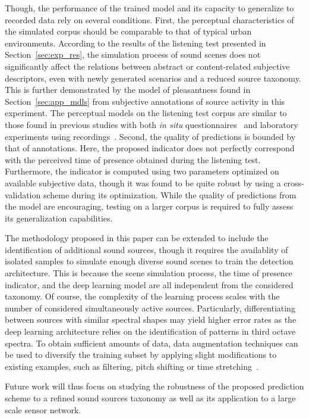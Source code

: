 \documentclass[twocolumn]{article}
\begin{document}
Though, the performance of the trained model and its capacity to generalize to recorded data rely on several conditions. First, the perceptual characteristics of the simulated corpus should be comparable to that of typical urban environments. According to the results of the listening test presented in Section~\ref{sec:exp_res}, the simulation process of sound scenes does not significantly affect the relations between abstract or content-related subjective descriptors, even with newly generated scenarios and a reduced source taxonomy. This is further demonstrated by the model of pleasantness found in Section~\ref{sec:app_mdls} from subjective annotations of source activity in this experiment. The perceptual models on the listening test corpus are similar to those found in previous studies with both \textit{in situ} questionnaires~\cite{aumond2017} and laboratory experiments using recordings~\cite{ricciardi2014}. Second, the quality of predictions is bounded by that of annotations. Here, the proposed indicator does not perfectly correspond with the perceived time of presence obtained during the listening test. Furthermore, the indicator is computed using two parameters optimized on available subjective data, though it was found to be quite robust by using a cross-validation scheme during its optimization. While the quality of predictions from the model are encouraging, testing on a larger corpus is required to fully assess its generalization capabilities.

The methodology proposed in this paper can be extended to include the identification of additional sound sources, though it requires the availablity of isolated samples to simulate enough diverse sound scenes to train the detection architecture. This is because the scene simulation process, the time of presence indicator, and the deep learning model are all independent from the considered taxonomy. Of course, the complexity of the learning process scales with the number of considered simultaneously active sources. Particularly, differentiating between sources with similar spectral shapes may yield higher error rates as the deep learning architecture relies on the identification of patterns in third octave spectra. To obtain sufficient amounts of data, data augmentation techniques can be used to diversify the training subset by applying slight modifications to existing examples, such as filtering, pitch shifting or time stretching~\cite{salamon2017-2, lasseck2018}.

Future work will thus focus on studying the robustness of the proposed prediction scheme to a refined sound sources taxonomy as well as its application to a large scale sensor network.
\end{document}
